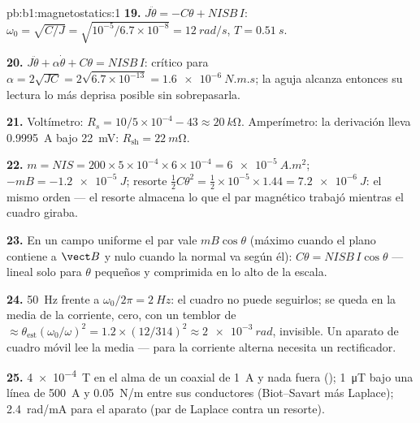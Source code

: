 \begin{solution}{pb:b1:magnetostatics:1}
\textbf{19.} $J\ddot\theta = -C\theta + NISB\,I$: $\omega_0 = \sqrt{C/J} = \sqrt{10^{-5}/6.7
\times 10^{-8}} = \qty{12}{rad/s}$, $T = \qty{0.51}{s}$.

\textbf{20.} $J\ddot\theta + \alpha\dot\theta + C\theta = NISB\,I$: crítico para
$\alpha = 2\sqrt{JC} = 2\sqrt{6.7 \times 10^{-13}} = \qty{1.6e-6}{N.m.s}$; la aguja
alcanza entonces su lectura lo más deprisa posible sin sobrepasarla.

\textbf{21.} Voltímetro: $R_s = 10/5 \times 10^{-4} - 43 \approx \qty{20}{k\ohm}$.
Amperímetro: la derivación lleva \qty{0.9995}{A} bajo \qty{22}{mV}: $R_{\text{sh}} =
\qty{22}{m\ohm}$.

\textbf{22.} $m = NIS = 200 \times 5 \times 10^{-4} \times 6 \times 10^{-4} = \qty{6e-5}{A.m^2}$;
$-mB = \qty{-1.2e-5}{J}$; resorte $\tfrac12C\theta^2 = \tfrac12 \times 10^{-5} \times 1.44 =
\qty{7.2e-6}{J}$: el mismo orden --- el resorte almacena lo que el par
magnético trabajó mientras el cuadro giraba.

\textbf{23.} En un campo uniforme el par vale $mB\cos\theta$ (máximo cuando
el plano contiene a $\vect B$ y nulo cuando la normal va según él): $C\theta =
NISB\,I\cos\theta$ --- lineal solo para $\theta$ pequeños y comprimida en lo
alto de la escala.

\textbf{24.} \qty{50}{Hz} frente a $\omega_0/2\pi = \qty{2}{Hz}$: el cuadro no puede
seguirlos; se queda en la media de la corriente, cero, con un temblor de
 $\approx \theta_{\text{est}}(\omega_0/\omega)^2 = 1.2 \times (12/314)^2 \approx
\qty{2e-3}{rad}$, invisible. Un aparato de cuadro móvil lee la media --- para
la corriente alterna necesita un rectificador.

\textbf{25.} \qty{4e-4}{T} en el alma de un coaxial de \qty{1}{A} y nada fuera
(); \qty{1}{\micro T} bajo una línea de \qty{500}{A} y \qty{0.05}{N/m}
entre sus conductores (Biot--Savart más Laplace); \qty{2.4}{rad/mA} para
el aparato (par de Laplace contra un resorte).
\end{solution}
